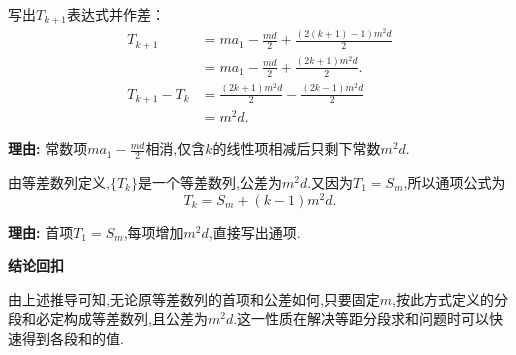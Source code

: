 \begin{proofbox}
\begin{description}[style=nextline, leftmargin=2.8em, labelsep=0.5em, itemsep=0.55em]
		\item[\textbf{步骤五（计算$T_{k+1}-T_k$）：}] 写出$T_{k+1}$表达式并作差：
			\[
				\begin{aligned}
					T_{k+1} &= m a_1 - \frac{m d}{2} + \frac{(2(k+1)-1)m^2 d}{2} \\
					&= m a_1 - \frac{m d}{2} + \frac{(2k+1)m^2 d}{2}. \\[4pt]
					T_{k+1} - T_k &= \frac{(2k+1)m^2 d}{2} - \frac{(2k-1)m^2 d}{2} \\
					&= m^2 d.
			\end{aligned}
			\]
			\par\textbf{理由:} 常数项$m a_1 - \frac{m d}{2}$相消,仅含$k$的线性项相减后只剩下常数$m^2 d$.

		\item[\textbf{步骤六(等差确认):}] 由等差数列定义,$\{T_k\}$是一个等差数列,公差为$m^2 d$.又因为$T_1=S_m$,所以通项公式为
			\[
				T_k = S_m + (k-1)m^2 d.
			\]
			\par\textbf{理由:} 首项$T_1=S_m$,每项增加$m^2 d$,直接写出通项.
	\end{description}

	\medskip
	\textbf{\textcolor{CProof}{结论回扣}}

	由上述推导可知,无论原等差数列的首项和公差如何,只要固定$m$,按此方式定义的分段和必定构成等差数列,且公差为$m^2 d$.这一性质在解决等距分段求和问题时可以快速得到各段和的值.

\end{proofbox}
